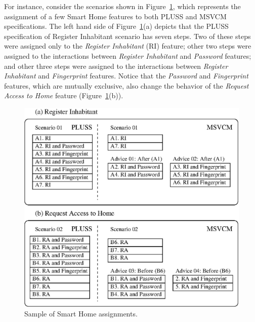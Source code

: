 \documentclass{sig-alt-full}
\begin{document}
For instance, consider the scenarios shown in
Figure~\ref{fig:smartHomeScenarios}, which represents the assignment of a few Smart Home features to 
both PLUSS and MSVCM specifications. The left hand side of
Figure~\ref{fig:smartHomeScenarios}(a) depicts that the PLUSS specification of
Register Inhabitant scenario has seven steps. Two of these steps were assigned only to the \emph{Register Inhabitant} (RI) feature; other two steps
were assigned to the interactions between \emph{Register Inhabitant} and
\emph{Password} features; and other three steps were assigned to the
interactions between \emph{Register Inhabitant} and \emph{Fingerprint}
features. Notice that the \emph{Password} and \emph{Fingerprint} features, which
are mutually exclusive, also change the behavior of the \emph{Request Access to
Home} feature (Figure~\ref{fig:smartHomeScenarios}(b)).


\begin{figure}[th]
 \begin{center}
  \includegraphics[scale=0.62]{img/comparisonScenarios.eps}
  \caption{Sample of Smart Home assignments.}
  \label{fig:smartHomeScenarios}
  \end{center}
\end{figure}
\end{document}
